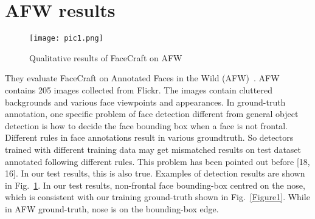 \documentclass[10pt,twocolumn,letterpaper]{article}
\begin{document}
\section{AFW results}
\begin{figure}[!htb]
 \centering
 \texttt{[image: pic1.png]}\\
 \caption{Qualitative results of FaceCraft on AFW}\label{Figure2}
 \end{figure}
They evaluate FaceCraft on Annotated Faces in the Wild (AFW)~\cite{name39}. AFW contains 205 images collected from Flickr. The images contain cluttered backgrounds and various face viewpoints and appearances. In ground-truth annotation, one specific problem of face detection different from general object detection is how to decide the face bounding box when a face is not frontal. Different rules in face annotations result in various groundtruth. So detectors trained with different training data may get mismatched results on test dataset annotated following different rules. This problem has been pointed out before [18, 16]. In our test results, this is also true. Examples of detection results are shown in Fig.~\ref{Figure2}. In our test results, non-frontal face bounding-box centred on the nose, which is consistent with our training ground-truth shown in Fig.~\ref{Figure1}. While in AFW ground-truth, nose is on the bounding-box edge.


\end{document}
